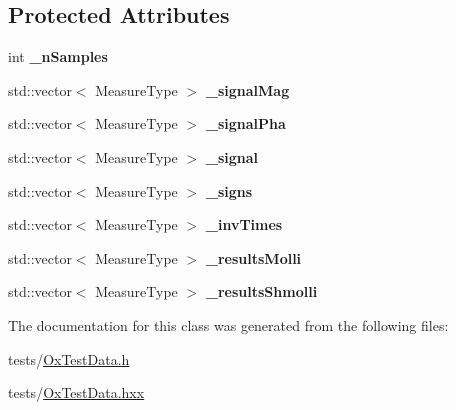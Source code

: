 \subsection*{Protected Attributes}
\begin{DoxyCompactItemize}
\item 
\hypertarget{class_ox_1_1_test_data_a41f65fef5fa534f713cb8a229e5ae14d}{int {\bfseries \-\_\-n\-Samples}}\label{class_ox_1_1_test_data_a41f65fef5fa534f713cb8a229e5ae14d}

\item 
\hypertarget{class_ox_1_1_test_data_a180e0158dc204212fd4879690b2ea3ad}{std\-::vector$<$ Measure\-Type $>$ {\bfseries \-\_\-signal\-Mag}}\label{class_ox_1_1_test_data_a180e0158dc204212fd4879690b2ea3ad}

\item 
\hypertarget{class_ox_1_1_test_data_a5012bab7b7943d05b33151aae38efcc1}{std\-::vector$<$ Measure\-Type $>$ {\bfseries \-\_\-signal\-Pha}}\label{class_ox_1_1_test_data_a5012bab7b7943d05b33151aae38efcc1}

\item 
\hypertarget{class_ox_1_1_test_data_a3d844b169fbdbfcb77d5ef0bf527f554}{std\-::vector$<$ Measure\-Type $>$ {\bfseries \-\_\-signal}}\label{class_ox_1_1_test_data_a3d844b169fbdbfcb77d5ef0bf527f554}

\item 
\hypertarget{class_ox_1_1_test_data_a9e22c4f291064b0c49f7c8007e77b40a}{std\-::vector$<$ Measure\-Type $>$ {\bfseries \-\_\-signs}}\label{class_ox_1_1_test_data_a9e22c4f291064b0c49f7c8007e77b40a}

\item 
\hypertarget{class_ox_1_1_test_data_a4a72325aa7d38c4cac1762a47b7eed1a}{std\-::vector$<$ Measure\-Type $>$ {\bfseries \-\_\-inv\-Times}}\label{class_ox_1_1_test_data_a4a72325aa7d38c4cac1762a47b7eed1a}

\item 
\hypertarget{class_ox_1_1_test_data_a91ae0ccd1b9dea3b83bfc4d7c300dbb0}{std\-::vector$<$ Measure\-Type $>$ {\bfseries \-\_\-results\-Molli}}\label{class_ox_1_1_test_data_a91ae0ccd1b9dea3b83bfc4d7c300dbb0}

\item 
\hypertarget{class_ox_1_1_test_data_ac549cebd93bd96747a68e3680442adfd}{std\-::vector$<$ Measure\-Type $>$ {\bfseries \-\_\-results\-Shmolli}}\label{class_ox_1_1_test_data_ac549cebd93bd96747a68e3680442adfd}

\end{DoxyCompactItemize}


The documentation for this class was generated from the following files\-:\begin{DoxyCompactItemize}
\item 
tests/\hyperlink{_ox_test_data_8h}{Ox\-Test\-Data.\-h}\item 
tests/\hyperlink{_ox_test_data_8hxx}{Ox\-Test\-Data.\-hxx}\end{DoxyCompactItemize}
